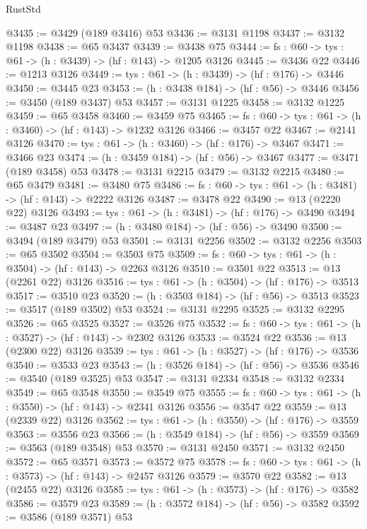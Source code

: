 \begin{lexlean}{RustStd}
\begin{coremodule}
@3435 := @3429 (@189 @3416) @53
@3436 := @3131 @1198
@3437 := @3132 @1198
@3438 := @65 @3437
@3439 := @3438 @75
@3444 := {fs : @60} -> {tys : @61} -> (h : @3439) -> (hf : @143) -> @1205 @3126
@3445 := @3436 @22
@3446 := @1213 @3126
@3449 := {tys : @61} -> (h : @3439) -> (hf : @176) -> @3446
@3450 := @3445 @23
@3453 := (h : @3438 @184) -> (hf : @56) -> @3446
@3456 := @3450 (@189 @3437) @53
@3457 := @3131 @1225
@3458 := @3132 @1225
@3459 := @65 @3458
@3460 := @3459 @75
@3465 := {fs : @60} -> {tys : @61} -> (h : @3460) -> (hf : @143) -> @1232 @3126
@3466 := @3457 @22
@3467 := @2141 @3126
@3470 := {tys : @61} -> (h : @3460) -> (hf : @176) -> @3467
@3471 := @3466 @23
@3474 := (h : @3459 @184) -> (hf : @56) -> @3467
@3477 := @3471 (@189 @3458) @53
@3478 := @3131 @2215
@3479 := @3132 @2215
@3480 := @65 @3479
@3481 := @3480 @75
@3486 := {fs : @60} -> {tys : @61} -> (h : @3481) -> (hf : @143) -> @2222 @3126
@3487 := @3478 @22
@3490 := @13 (@2220 @22) @3126
@3493 := {tys : @61} -> (h : @3481) -> (hf : @176) -> @3490
@3494 := @3487 @23
@3497 := (h : @3480 @184) -> (hf : @56) -> @3490
@3500 := @3494 (@189 @3479) @53
@3501 := @3131 @2256
@3502 := @3132 @2256
@3503 := @65 @3502
@3504 := @3503 @75
@3509 := {fs : @60} -> {tys : @61} -> (h : @3504) -> (hf : @143) -> @2263 @3126
@3510 := @3501 @22
@3513 := @13 (@2261 @22) @3126
@3516 := {tys : @61} -> (h : @3504) -> (hf : @176) -> @3513
@3517 := @3510 @23
@3520 := (h : @3503 @184) -> (hf : @56) -> @3513
@3523 := @3517 (@189 @3502) @53
@3524 := @3131 @2295
@3525 := @3132 @2295
@3526 := @65 @3525
@3527 := @3526 @75
@3532 := {fs : @60} -> {tys : @61} -> (h : @3527) -> (hf : @143) -> @2302 @3126
@3533 := @3524 @22
@3536 := @13 (@2300 @22) @3126
@3539 := {tys : @61} -> (h : @3527) -> (hf : @176) -> @3536
@3540 := @3533 @23
@3543 := (h : @3526 @184) -> (hf : @56) -> @3536
@3546 := @3540 (@189 @3525) @53
@3547 := @3131 @2334
@3548 := @3132 @2334
@3549 := @65 @3548
@3550 := @3549 @75
@3555 := {fs : @60} -> {tys : @61} -> (h : @3550) -> (hf : @143) -> @2341 @3126
@3556 := @3547 @22
@3559 := @13 (@2339 @22) @3126
@3562 := {tys : @61} -> (h : @3550) -> (hf : @176) -> @3559
@3563 := @3556 @23
@3566 := (h : @3549 @184) -> (hf : @56) -> @3559
@3569 := @3563 (@189 @3548) @53
@3570 := @3131 @2450
@3571 := @3132 @2450
@3572 := @65 @3571
@3573 := @3572 @75
@3578 := {fs : @60} -> {tys : @61} -> (h : @3573) -> (hf : @143) -> @2457 @3126
@3579 := @3570 @22
@3582 := @13 (@2455 @22) @3126
@3585 := {tys : @61} -> (h : @3573) -> (hf : @176) -> @3582
@3586 := @3579 @23
@3589 := (h : @3572 @184) -> (hf : @56) -> @3582
@3592 := @3586 (@189 @3571) @53

\end{coremodule}
\end{lexlean}
